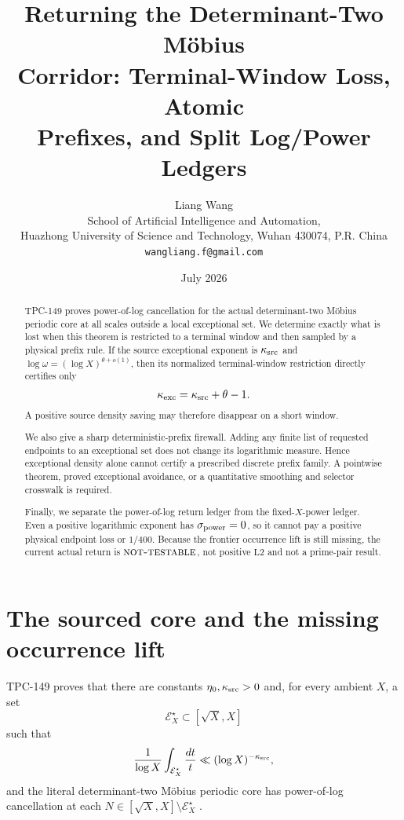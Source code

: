 \documentclass[11pt]{article}
\title{\textbf{Returning the Determinant-Two M\"obius}\\
\textbf{Corridor: Terminal-Window Loss, Atomic}\\
\textbf{Prefixes, and Split Log/Power Ledgers}}
\author{Liang Wang\\
School of Artificial Intelligence and Automation,\\
Huazhong University of Science and Technology, Wuhan 430074, P.R. China\\
\texttt{wangliang.f@gmail.com}}
\date{July 2026}
\theoremstyle{definition}
\theoremstyle{remark}
\newcommand{\Ltwo}{\mathrm{L2}}
\newcommand{\NT}{\textnormal{\textsc{not-testable}}}
\begin{document}
\maketitle

\begin{abstract}
TPC-149 proves power-of-log cancellation for the actual
determinant-two M\"obius periodic core at all scales outside a local
exceptional set.  We determine exactly what is lost when this theorem
is restricted to a terminal window and then sampled by a physical
prefix rule.  If the source exceptional exponent is
\(\kappa_{\rm src}\) and
\(\log\omega=(\log X)^{\theta+o(1)}\), then its normalized
terminal-window restriction directly certifies only
\[
 \kappa_{\rm exc}=\kappa_{\rm src}+\theta-1.
\]
A positive source density saving may therefore disappear on a short
window.

We also give a sharp deterministic-prefix firewall.  Adding any
finite list of requested endpoints to an exceptional set does not
change its logarithmic measure.  Hence exceptional density alone
cannot certify a prescribed discrete prefix family.  A pointwise
theorem, proved exceptional avoidance, or a quantitative smoothing
and selector crosswalk is required.

Finally, we separate the power-of-log return ledger from the
fixed-\(X\)-power ledger.  Even a positive logarithmic exponent has
\(\sigma_{\rm power}=0\), so it cannot pay a positive physical
endpoint loss or \(1/400\).  Because the frontier occurrence lift is
still missing, the current actual return is \(\NT\), not positive
\(\Ltwo\) and not a prime-pair result.
\end{abstract}

\section{The sourced core and the missing occurrence lift}

TPC-149 proves that there are constants
\(\eta_0,\kappa_{\rm src}>0\) and, for every ambient \(X\), a set
\[
 \mathcal E_X^\star\subset[\sqrt X,X]
\]
such that
\begin{equation}
 \frac1{\log X}\int_{\mathcal E_X^\star}\frac{dt}{t}
 \ll(\log X)^{-\kappa_{\rm src}},
\label{eq:source-density}
\end{equation}
and the literal determinant-two M\"obius periodic core has
power-of-log cancellation at each
\(N\in[\sqrt X,X]\setminus\mathcal E_X^\star\)
\citep{WangTPC149,TaoTeravainen2026}.
\end{document}
